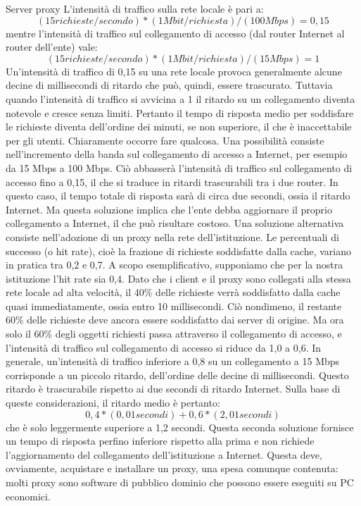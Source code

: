 \begin{Example}{Server proxy}{}
    L'intensità di traffico sulla rete locale è pari a:
    \begin{equation*}
        (15 richieste/secondo) * (1 Mbit/richiesta) / (100 Mbps) = 0,15
    \end{equation*}
    mentre l'intensità di traffico sul collegamento di accesso (dal router Internet al router dell'ente) vale:
    \begin{equation*}
        (15 richieste/secondo) * (1 Mbit/richiesta) / (15 Mbps) = 1
    \end{equation*}
    Un'intensità di traffico di 0,15 su una rete locale provoca generalmente alcune decine di millisecondi di ritardo che può, quindi, essere trascurato. Tuttavia quando l'intensità di traffico si avvicina a 1 il ritardo su un collegamento diventa notevole e cresce senza limiti. Pertanto il tempo di risposta medio per soddisfare le richieste diventa dell'ordine dei minuti, se non superiore, il che è inaccettabile per gli utenti. Chiaramente occorre fare qualcosa. Una possibilità consiste nell'incremento della banda sul collegamento di accesso a Internet, per esempio da 15 Mbps a 100 Mbps. Ciò abbasserà l'intensità di traffico sul collegamento di accesso fino a 0,15, il che si traduce in ritardi trascurabili tra i due router. In questo caso, il tempo totale di risposta sarà di circa due secondi, ossia il ritardo Internet. Ma questa soluzione implica che l'ente debba aggiornare il proprio collegamento a Internet, il che può risultare costoso. Una soluzione alternativa consiste nell'adozione di un proxy nella rete dell'istituzione. Le percentuali di successo (o hit rate), cioè la frazione di richieste soddisfatte dalla cache, variano in pratica tra 0,2 e 0,7. A scopo esemplificativo, supponiamo che per la nostra istituzione l'hit rate sia 0,4. Dato che i client e il proxy sono collegati alla stessa rete locale ad alta velocità, il 40\% delle richieste verrà soddisfatto dalla cache quasi immediatamente, ossia entro 10 millisecondi. Ciò nondimeno, il restante 60\% delle richieste deve ancora essere soddisfatto dai server di origine. Ma ora solo il 60\% degli oggetti richiesti passa attraverso il collegamento di accesso, e l'intensità di traffico sul collegamento di accesso si riduce da 1,0 a 0,6. In generale, un'intensità di traffico inferiore a 0,8 su un collegamento a 15 Mbps corrisponde a un piccolo ritardo, dell'ordine delle decine di millisecondi. Questo ritardo è trascurabile rispetto ai due secondi di ritardo Internet. Sulla base di queste considerazioni, il ritardo medio è pertanto:
    \begin{equation*}
        0,4 * (0,01 secondi) + 0,6 * (2,01 secondi)
    \end{equation*}
    che è solo leggermente superiore a 1,2 secondi. Questa seconda soluzione fornisce un tempo di risposta perfino inferiore rispetto alla prima e non richiede l'aggiornamento del collegamento dell'istituzione a Internet. Questa deve, ovviamente, acquistare e installare un proxy, una spesa comunque contenuta: molti proxy sono software di pubblico dominio che possono essere eseguiti su PC economici.
\end{Example}

